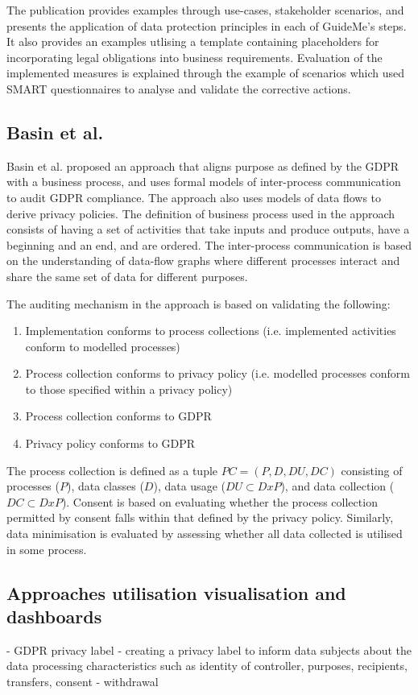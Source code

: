 The publication provides examples through use-cases, stakeholder scenarios, and presents the application of data protection principles in each of GuideMe's steps. It also provides an examples utlising a template containing placeholders for incorporating legal obligations into business requirements. Evaluation of the implemented measures is explained through the example of scenarios which used SMART questionnaires to analyse and validate the corrective actions.

\subsection{Basin et al.}
Basin et al. \cite{basin_purpose_2018} proposed an approach that aligns purpose as defined by the GDPR with a business process, and uses formal models of inter-process communication to audit GDPR compliance. The approach also uses models of data flows to derive privacy policies. 
The definition of business process used in the approach consists of having a set of activities that take inputs and produce outputs, have a beginning and an end, and are ordered. The inter-process communication is based on the understanding of data-flow graphs where different processes interact and share the same set of data for different purposes.

The auditing mechanism in the approach is based on validating the following:
\begin{enumerate}
    \item Implementation conforms to process collections (i.e. implemented activities conform to modelled processes)
    \item Process collection conforms to privacy policy (i.e. modelled processes conform to those specified within a privacy policy)
    \item Process collection conforms to GDPR
    \item Privacy policy conforms to GDPR
\end{enumerate}

The process collection is defined as a tuple $PC = (P,D,DU,DC)$ consisting of processes ($P$), data classes ($D$), data usage ($DU\subset D x P$), and data collection ($DC\subset D x P$). Consent is based on evaluating whether the process collection permitted by consent falls within that defined by the privacy policy. Similarly, data minimisation is evaluated by assessing whether all data collected is utilised in some process.

\subsection{Approaches utilisation visualisation and dashboards}
\cite{fox_communicating_2018} - GDPR privacy label - creating a privacy label to inform data subjects about the data processing characteristics such as identity of controller, purposes, recipients, transfers, consent - withdrawal

